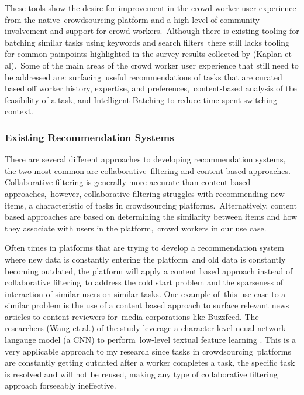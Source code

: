 \documentclass[letterpaper,12pt]{article}
\begin{document}
These tools show the desire for improvement in the crowd worker user experience from the native\
crowdsourcing platform and a high level of community involvement and support for crowd workers.\
Although there is existing tooling for batching similar tasks using keywords and search filters\
there still lacks tooling for common painpoints highlighted in the survey results collected by (Kaplan et al).\
Some of the main areas of the crowd worker user experience that still need to be addressed are: surfacing\
useful recommendations of tasks that are curated based off worker history, expertise, and preferences,\
content-based analysis of the feasibility of a task, and Intelligent Batching to reduce time spent switching
context.

\subsubsection{Existing Recommendation Systems}
There are several different approaches to developing recommendation systems, the two most common are collaborative\
filtering and content based approaches. Collaborative filtering is generally more accurate than content based approaches,\
however, collaborative filtering struggles with recommending new items, a characteristic of tasks in crowdsourcing platforms.\
Alternatively, content based approaches are based on determining the similarity between items and how they associate with users in the platform,\
crowd workers in our use case.

Often times in platforms that are trying to develop a recommendation system where new data is constantly entering the platform\
and old data is constantly becoming outdated, the platform will apply a content based approach instead of collaborative filtering\
to address the cold start problem and the sparseness of interaction of similar users on similar tasks. One example of\
this use case to a similar problem is the use of a content based approach to surface relevant news articles to content reviewers for\
media corporations like Buzzfeed. The researchers (Wang et al.) of the study leverage a character level neual network langauge model (a CNN) to perform\
low-level textual feature learning \cite{wang2017dynamic}. This is a very applicable approach to my research since tasks in crowdsourcing\
platforms are constantly getting outdated after a worker completes a task, the specific task is resolved and will not be reused, making
any type of collaborative filtering approach forseeably ineffective.
\end{document}
